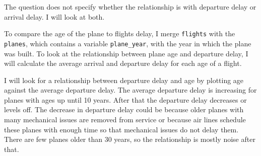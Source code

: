 \documentclass[]{book}
\newenvironment{Shaded}{\begin{snugshade}}{\end{snugshade}}
\newcommand{\DataTypeTok}[1]{\textcolor[rgb]{0.13,0.29,0.53}{#1}}
\newcommand{\KeywordTok}[1]{\textcolor[rgb]{0.13,0.29,0.53}{\textbf{#1}}}
\newcommand{\NormalTok}[1]{#1}
\newcommand{\OperatorTok}[1]{\textcolor[rgb]{0.81,0.36,0.00}{\textbf{#1}}}
\newcommand{\OtherTok}[1]{\textcolor[rgb]{0.56,0.35,0.01}{#1}}
\newcommand{\StringTok}[1]{\textcolor[rgb]{0.31,0.60,0.02}{#1}}
\theoremstyle{plain}
\theoremstyle{remark}
\begin{document}
The question does not specify whether the relationship is with departure delay
or arrival delay. I will look at both.

To compare the age of the plane to flights delay, I merge \texttt{flights} with
the \texttt{planes}, which contains a variable \texttt{plane\_year}, with the year in which the
plane was built. To look at the relationship between plane age and departure
delay, I will calculate the average arrival and departure delay for each age
of a flight.

\begin{Shaded}
\end{Shaded}

I will look for a relationship between departure delay and age by plotting
age against the average departure delay. The average departure delay is increasing
for planes with ages up until 10 years. After that the departure delay decreases
or levels off. The decrease in departure delay could be because older planes
with many mechanical issues are removed from service or because air lines schedule
these planes with enough time so that mechanical issues do not delay them.
There are few planes older than 30 years, so the relationship is mostly noise
after that.
\end{document}
